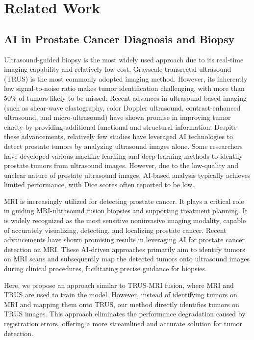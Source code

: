 \section{Related Work}
\subsection{AI in Prostate Cancer Diagnosis and Biopsy}
Ultrasound-guided biopsy is the most widely used approach due to its real-time imaging capability and relatively low cost. Grayscale transrectal ultrasound (TRUS)\cite{bhattacharya2022review} is the most commonly adopted imaging method. However, its inherently low signal-to-noise ratio makes tumor identification challenging, with more than 50\% of tumors likely to be missed\cite{choi2019comparison,azizi2018deep}. Recent advances in ultrasound-based imaging (such as shear-wave elastography\cite{woo2017shear,sigrist2017ultrasound}, color Doppler ultrasound\cite{liau2019prostate}, contrast-enhanced ultrasound\cite{ashrafi2018contrast}, and micro-ultrasound\cite{harland2021micro}) have shown promise in improving tumor clarity by providing additional functional and structural information. Despite these advancements, relatively few studies have leveraged AI technologies to detect prostate tumors by analyzing ultrasound images alone\cite{bhattacharya2022review}. Some researchers have developed various machine learning and deep learning methods to identify prostate tumors from ultrasound images\cite{wildeboer2020automated,sedghi2019deep,han2008computer,jahanandish2024deep}. However, due to the low-quality and unclear nature of prostate ultrasound images, AI-based analysis typically achieves limited performance, with Dice scores often reported to be low\cite{pensa2024evaluation}.

MRI is increasingly utilized for detecting prostate cancer\cite{bhattacharya2022review, pensa2024evaluation}. It plays a critical role in guiding MRI-ultrasound fusion biopsies and supporting treatment planning. It is widely recognized as the most sensitive noninvasive imaging modality, capable of accurately visualizing, detecting, and localizing prostate cancer. Recent advancements have shown promising results in leveraging AI for prostate cancer detection on MRI\cite{khan2021recent,ye2022medical}. These AI-driven approaches primarily aim to identify tumors on MRI scans and subsequently map the detected tumors onto ultrasound images during clinical procedures, facilitating precise guidance for biopsies.

Here, we propose an approach similar to TRUS-MRI fusion, where MRI and TRUS are used to train the model. However, instead of identifying tumors on MRI and mapping them onto TRUS, our method directly identifies tumors on TRUS images. This approach eliminates the performance degradation caused by registration errors, offering a more streamlined and accurate solution for tumor detection.

